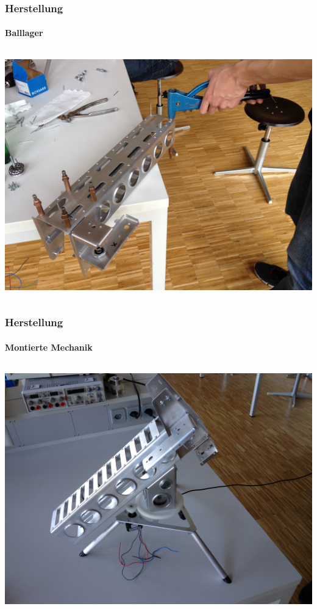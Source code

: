 \begin{frame}
    \frametitle{Herstellung}
    \framesubtitle{Balllager}
    \begin{columns}
        \begin{column}{0.9\textwidth}
            \centering
            \includegraphics[width=1.0\textwidth]{FotosM/Bild5.JPG}
        \end{column}
    \end{columns}
\end{frame}
\begin{frame}
    \frametitle{Herstellung}
    \framesubtitle{Montierte Mechanik}
    \begin{columns}
        \begin{column}{0.9\textwidth}
            \centering
            \includegraphics[width=1.0\textwidth]{FotosM/Bild6.JPG}
        \end{column}
    \end{columns}
\end{frame}
